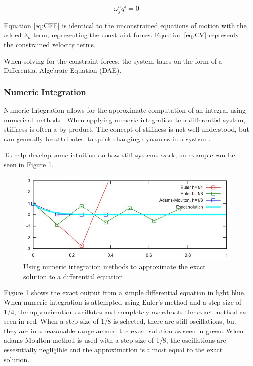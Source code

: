 \begin{equation}
\label{eq:CV}
\omega_{j}^{a} \dot{q}^{j} = 0
\end{equation}

Equation \ref{eq:CFE} is identical to the unconstrained equations of motion with the added $\lambda_{a}$ term, representing the constraint forces.
Equation \ref{eq:CV} represents the constrained velocity terms. 
\par
When solving for the constraint forces, the system takes on the form of a Differential Algebraic Equation (DAE).

\subsubsection{Numeric Integration}

Numeric Integration allows for the approximate computation of an integral using numerical methods \cite{WolframNumeric}.
When applying numeric integration to a differential system, stiffness is often a by-product.
The concept of stiffness is not well understood, but can generally be attributed to quick changing dynamics in a system \cite{StiffSystem}.
\par
To help develop some intuition on how stiff systems work, an example can be seen in Figure \ref{fig:stiffsystem}.

\begin{figure}[!htb]
	\centering
	\includegraphics[width=\linewidth]{stiffsystem.JPG}
	\caption{Using numeric integration methods to approximate the exact solution to a differential equation}\label{fig:stiffsystem}
	\endminipage
\end{figure}
Figure \ref{fig:stiffsystem} shows the exact output from a simple differential equation in light blue. 
When numeric integration is attempted using Euler's method and a step size of 1/4, the approximation oscillates and completely overshoots the exact method as seen in red. 
When a step size of 1/8 is selected, there are still oscillations, but they are in a reasonable range around the exact solution as seen in green. 
When adams-Moulton method is used with a step size of 1/8, the oscillations are essesntially negligible and the approximation is almost equal to the exact solution.


